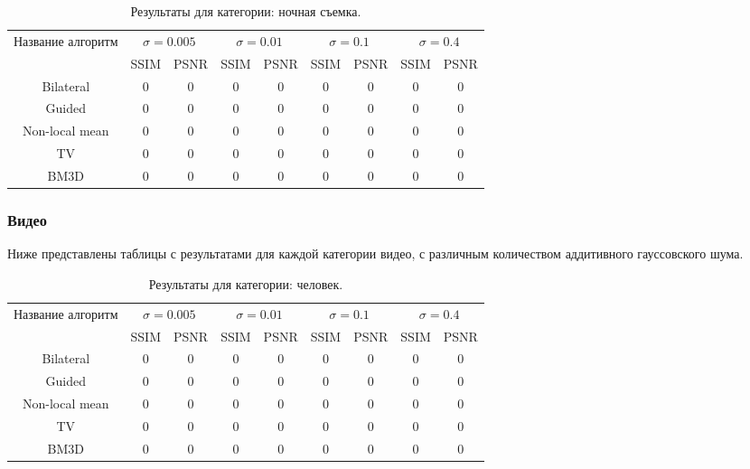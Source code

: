 \begin{table}[H]
	\caption{\label{tab:bolts} Результаты для категории: ночная съемка.}
	\begin{tabular}{|c|c|c|c|c|c|c|c|c|}
		\hline
		Название алгоритм & \multicolumn{2}{|c|}{$\sigma=0.005$}  & \multicolumn{2}{|c|}{$\sigma=0.01$}& \multicolumn{2}{|c|}{$\sigma=0.1$} & \multicolumn{2}{|c|}{$\sigma=0.4$} \\
		\cline{2-9}
		& SSIM  & PSNR & SSIM  & PSNR & SSIM  & PSNR & SSIM  & PSNR\\
		\hline
		Bilateral & 0 & 0& 0 & 0& 0 & 0 & 0 & 0 \\
		\hline
		Guided & 0 & 0& 0 & 0& 0 & 0 & 0 & 0 \\
		\hline
		Non-local mean & 0 & 0& 0 & 0& 0 & 0 & 0 & 0 \\
		\hline
		TV & 0 & 0& 0 & 0& 0 & 0 & 0 & 0 \\
		\hline
		BM3D & 0 & 0& 0 & 0& 0 & 0 & 0 & 0 \\
		\hline	
	\end{tabular}
\end{table}

\subsubsection{Видео}
Ниже представлены таблицы с результатами для каждой категории видео, с различным количеством аддитивного гауссовского шума.
\begin{table}[H]
	\caption{\label{tab:bolts} Результаты для категории: человек.}
	\begin{tabular}{|c|c|c|c|c|c|c|c|c|}
		\hline
		Название алгоритм & \multicolumn{2}{|c|}{$\sigma=0.005$}  & \multicolumn{2}{|c|}{$\sigma=0.01$}& \multicolumn{2}{|c|}{$\sigma=0.1$} & \multicolumn{2}{|c|}{$\sigma=0.4$} \\
		\cline{2-9}
		& SSIM  & PSNR & SSIM  & PSNR & SSIM  & PSNR & SSIM  & PSNR\\
		\hline
		Bilateral & 0 & 0& 0 & 0& 0 & 0 & 0 & 0 \\
		\hline
		Guided & 0 & 0& 0 & 0& 0 & 0 & 0 & 0 \\
		\hline
		Non-local mean & 0 & 0& 0 & 0& 0 & 0 & 0 & 0 \\
		\hline
		TV & 0 & 0& 0 & 0& 0 & 0 & 0 & 0 \\
		\hline
		BM3D & 0 & 0& 0 & 0& 0 & 0 & 0 & 0 \\
		\hline	
	\end{tabular}
\end{table}

